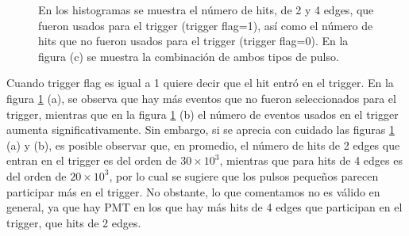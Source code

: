\documentclass[11pt]{article}
\begin{document}
\begin{figure}[H]
\centering
{}

\caption{En los histogramas se muestra el número de hits, de 2 y 4 edges, que fueron usados para el trigger (trigger flag=1), así como el número de hits que no fueron usados para el trigger (trigger flag=0). En la figura (c) se muestra la combinación de ambos tipos de pulso.}
\label{fig:Prob4}
\end{figure}

Cuando trigger flag es igual a 1 quiere decir que el hit entró en el trigger. En la figura \ref{fig:Prob4} (a), se observa que hay más eventos que no fueron seleccionados para el trigger, mientras que en la figura \ref{fig:Prob4} (b) el número de eventos usados en el trigger aumenta significativamente. Sin embargo, si se aprecia con cuidado las figuras \ref{fig:Prob4} (a) y (b), es posible observar que, en promedio, el número de hits de 2 edges que entran en el trigger es del orden de $30\times 10^3$, mientras que para hits de 4 edges es del orden de $20\times 10^3$, por lo cual se sugiere que los pulsos pequeños parecen participar más en el trigger. No obstante, lo que comentamos no es válido en general, ya que hay PMT en los que hay más hits de 4 edges que participan en el trigger, que hits de 2 edges. 
\end{document}
